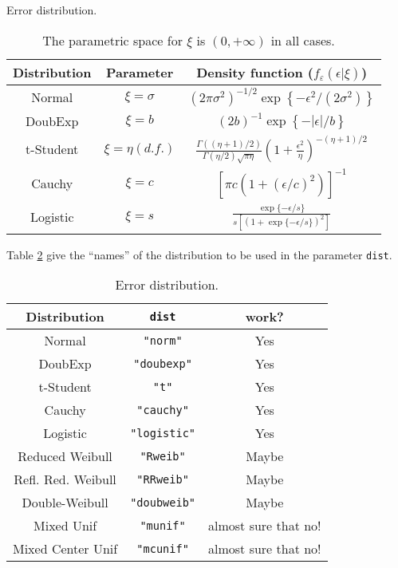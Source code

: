 \documentclass[nogin,letterpaper,12pt]{article}
\begin{document}
\begin{center}
\begin{table}[ht!]
\caption{Error distribution.}
\label{table_1}
\centering
\begin{tabular}{ccc}
\hline
Distribution & Parameter & Density function ($f_\varepsilon(\epsilon | \xi)$) \\
\hline
\hline
Normal & $\xi = \sigma$ & $(2 \pi \sigma^2)^{-1/2} \exp\left\{-\epsilon^2/(2 \sigma^2)
\right\}$ \vspace{0.1cm}\\
DoubExp & $\xi = b$ & $(2b)^{-1} \exp\left\{ -|\epsilon|/b \right\} $ \vspace{0.1cm}\\
t-Student & $\xi = \eta  (d.f.)$ & $\frac{\Gamma((\eta+1)/2)}{\Gamma(\eta/2)
\sqrt{\pi \eta}} \left(1 + \frac{\epsilon^2}{\eta} \right)^{-(\eta+1)/2} $ \vspace{0.1cm}\\
Cauchy & $\xi = c$ & $ \left[\pi c \left(1 + (\epsilon/c)^2\right)\right]^{-1} $ \vspace{0.1cm}\\
Logistic & $\xi = s$ & $\frac{\exp\{-\epsilon/s\}}{s \left[\left(1+\exp\{-\epsilon/s\}\right)^2\right]}$ \\ \hline
\end{tabular}
\caption*{{\footnotesize The parametric space for $\xi$ is $(0,+\infty)$ in all cases. \hspace{2cm}~}}
\end{table}
\end{center}

Table \ref{table_2} give the ``names'' of the distribution to be used in the parameter \verb=dist=.

\begin{center}
\begin{table}[ht!]
\caption{Error distribution.}
\label{table_2}
\centering
\begin{tabular}{ccc}
\hline
Distribution & \verb=dist=    & work?\\
\hline
\hline
Normal    & \verb="norm"=     & Yes\\
DoubExp   & \verb="doubexp"=  & Yes\\
t-Student & \verb="t"=        & Yes\\
Cauchy    & \verb="cauchy"=   & Yes\\
Logistic  & \verb="logistic"= & Yes\\
\hline
\hline
Reduced Weibull    & \verb="Rweib"=    & Maybe\\
Refl. Red. Weibull & \verb="RRweib"=   & Maybe\\
Double-Weibull     & \verb="doubweib"= & Maybe\\
\hline
Mixed Unif         & \verb="munif"=    & almost sure that no!\\
Mixed Center Unif  & \verb="mcunif"=   & almost sure that no!\\
\hline
\end{tabular}
\end{table}
\end{center}
\end{document}
